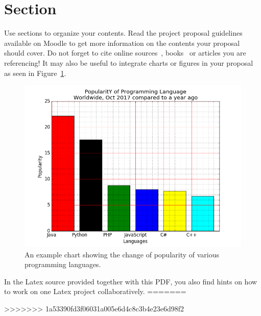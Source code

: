 \documentclass[
     12pt,         %
     a4paper,      %
     BCOR10mm,     %
     DIV14,        %
     ]{article}
\begin{document}







\section{Section}

Use sections to organize your contents. Read the project proposal guidelines available on Moodle to get more information on the contents your proposal should cover. Do not forget to cite online sources~\cite{WFR2017}, books~\cite{goldberg2017neural} or articles you are referencing! It may also be useful to integrate charts or figures in your proposal as seen in Figure~\ref{fig:example}.

\begin{figure}[h]
  \centering
  \includegraphics[scale=0.3]{figures/example_barchart}
  \caption[]{An example chart showing the change of popularity of various programming languages\footnotemark[1].}
  \label{fig:example}
\end{figure}


In the Latex source provided together with this PDF, you also find hints on how to work on one Latex project collaboratively.
=======

>>>>>>> 1a53390fd3f06031a005e6d4c8c3b4e23e6d98f2

\end{document}
